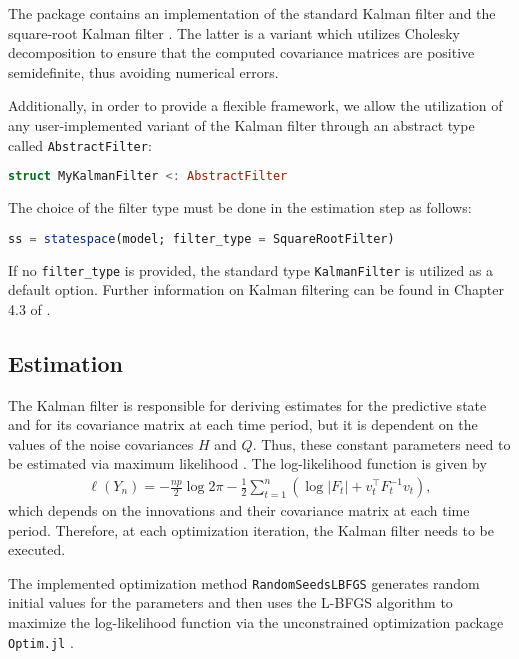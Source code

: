 \documentclass{juliacon}
\begin{document}
The package contains an implementation of the standard Kalman filter and the square-root Kalman filter \cite{durbin2012time}. The latter is a variant which utilizes Cholesky decomposition to ensure that the computed covariance matrices are positive semidefinite, thus avoiding numerical errors.

Additionally, in order to provide a flexible framework, we allow the utilization of any user-implemented variant of the Kalman filter through an abstract type called \texttt{AbstractFilter}:
%
\begin{lstlisting}[language = Julia]
struct MyKalmanFilter <: AbstractFilter
\end{lstlisting}

The choice of the filter type must be done in the estimation step as follows:
%
\begin{lstlisting}[language = Julia]
ss = statespace(model; filter_type = SquareRootFilter)
\end{lstlisting}

If no \texttt{filter\_type} is provided, the standard type \texttt{KalmanFilter} is utilized as a default option. Further information on Kalman filtering can be found in Chapter 4.3 of \cite{durbin2012time}.

\subsection{Estimation}

The Kalman filter is responsible for deriving estimates for the predictive state and for its covariance matrix at each time period, but it is dependent on the values of the noise covariances $H$ and $Q$. Thus, these constant parameters need to be estimated via maximum likelihood \cite{casella2002statistical}. The log-likelihood function is given by
%
\begin{align}
    \ell(Y_{n}) = -\frac{np}{2} \log 2 \pi - \frac{1}{2} \sum_{t=1}^{n} (\log |F_{t}| + v_{t}^{\top} F_{t}^{-1} v_{t}),
\end{align}
%
which depends on the innovations and their covariance matrix at each time period. Therefore, at each optimization iteration, the Kalman filter needs to be executed.

The implemented optimization method \texttt{RandomSeedsLBFGS} generates random initial values for the parameters and then uses the L-BFGS algorithm \cite{liu1989limited} to maximize the log-likelihood function via the unconstrained optimization package \texttt{Optim.jl} \cite{mogensen2018optim}.
\end{document}
